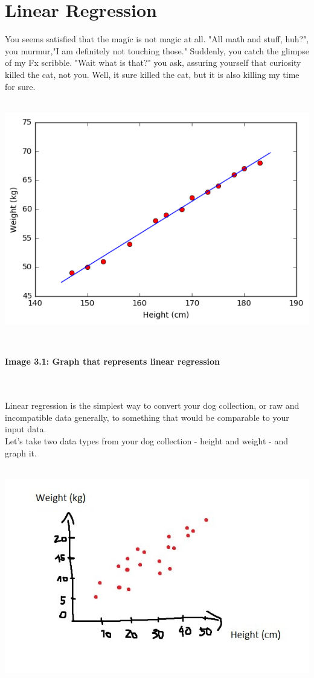\documentclass{article}
\begin{document}
\section{Linear Regression}
	You seems satisfied that the magic is not magic at all. "All math and stuff, huh?", you murmur,"I am definitely not touching those." Suddenly, you catch the glimpse of my Fx scribble. "Wait what is that?" you ask, assuring yourself that curiosity killed the cat, not you. Well, it sure killed the cat, but it is also killing my time for sure. \\\\ \centerline{\includegraphics[scale=0.6]{img3}}\\
	\centerline{\small{\textbf{Image 3.1: Graph that represents linear regression}}}	\\\\
	\tab \tab Linear regression is the simplest way to convert your dog collection, or raw and incompatible data generally, to something that would be comparable to your input data.\\
	\tab\tab Let's take two data types from your dog collection - height and weight - and graph it.\\\\
	\centerline{\includegraphics[scale=0.5]{img4}} \\
\end{document}
